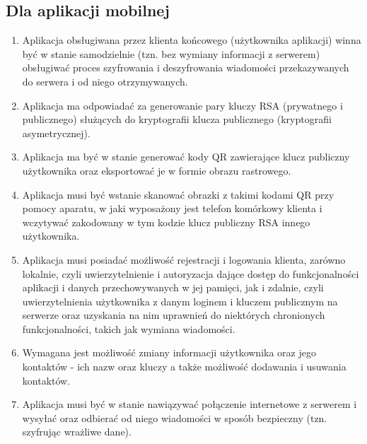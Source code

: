 \documentclass[../main.tex]{subfiles}
\begin{document}
\subsection{Dla aplikacji mobilnej}\label{sec:mobile_application_requirements}
\begin{enumerate}
	\item Aplikacja obsługiwana przez klienta końcowego (użytkownika aplikacji) winna być w stanie samodzielnie (tzn. bez wymiany informacji z serwerem) obsługiwać proces szyfrowania i deszyfrowania wiadomości przekazywanych do serwera i od niego otrzymywanych.
	\item Aplikacja ma odpowiadać za generowanie pary kluczy RSA (prywatnego i publicznego) służących do kryptografii klucza publicznego (kryptografii asymetrycznej).
	\item Aplikacja ma być w stanie generować kody QR zawierające klucz publiczny użytkownika oraz eksportować je w formie obrazu rastrowego.
	\item Aplikacja musi być wstanie skanować obrazki z takimi kodami QR przy pomocy aparatu, w jaki wyposażony jest telefon komórkowy klienta i wczytywać zakodowany w tym kodzie klucz publiczny RSA innego użytkownika.
	\item Aplikacja musi posiadać możliwość rejestracji i logowania klienta, zarówno lokalnie, czyli uwierzytelnienie i autoryzacja dające dostęp do funkcjonalności aplikacji i danych przechowywanych w jej pamięci, jak i zdalnie, czyli uwierzytelnienia użytkownika z danym loginem i kluczem publicznym na serwerze oraz uzyskania na nim uprawnień do niektórych chronionych funkcjonalności, takich jak wymiana wiadomości.
	\item Wymagana jest możliwość zmiany informacji użytkownika oraz jego kontaktów - ich nazw oraz kluczy a także możliwość dodawania i usuwania kontaktów.
	\item Aplikacja musi być w stanie nawiązywać połączenie internetowe z serwerem i wysyłać oraz odbierać od niego wiadomości w sposób bezpieczny (tzn. szyfrując wrażliwe dane).
\end{enumerate}
\end{document}
